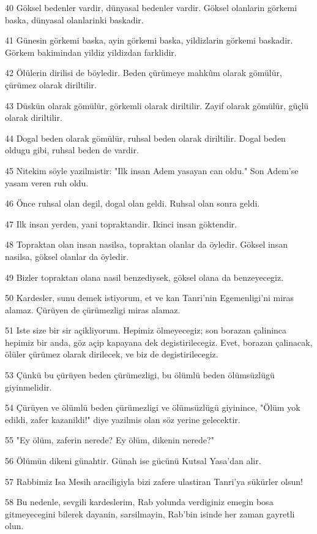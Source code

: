 \par 40 Göksel bedenler vardir, dünyasal bedenler vardir. Göksel olanlarin görkemi baska, dünyasal olanlarinki baskadir.
\par 41 Günesin görkemi baska, ayin görkemi baska, yildizlarin görkemi baskadir. Görkem bakimindan yildiz yildizdan farklidir.
\par 42 Ölülerin dirilisi de böyledir. Beden çürümeye mahkûm olarak gömülür, çürümez olarak diriltilir.
\par 43 Düskün olarak gömülür, görkemli olarak diriltilir. Zayif olarak gömülür, güçlü olarak diriltilir.
\par 44 Dogal beden olarak gömülür, ruhsal beden olarak diriltilir. Dogal beden oldugu gibi, ruhsal beden de vardir.
\par 45 Nitekim söyle yazilmistir: "Ilk insan Adem yasayan can oldu." Son Adem'se yasam veren ruh oldu.
\par 46 Önce ruhsal olan degil, dogal olan geldi. Ruhsal olan sonra geldi.
\par 47 Ilk insan yerden, yani topraktandir. Ikinci insan göktendir.
\par 48 Topraktan olan insan nasilsa, topraktan olanlar da öyledir. Göksel insan nasilsa, göksel olanlar da öyledir.
\par 49 Bizler topraktan olana nasil benzediysek, göksel olana da benzeyecegiz.
\par 50 Kardesler, sunu demek istiyorum, et ve kan Tanri'nin Egemenligi'ni miras alamaz. Çürüyen de çürümezligi miras alamaz.
\par 51 Iste size bir sir açikliyorum. Hepimiz ölmeyecegiz; son borazan çalininca hepimiz bir anda, göz açip kapayana dek degistirilecegiz. Evet, borazan çalinacak, ölüler çürümez olarak dirilecek, ve biz de degistirilecegiz.
\par 53 Çünkü bu çürüyen beden çürümezligi, bu ölümlü beden ölümsüzlügü giyinmelidir.
\par 54 Çürüyen ve ölümlü beden çürümezligi ve ölümsüzlügü giyinince, "Ölüm yok edildi, zafer kazanildi!" diye yazilmis olan söz yerine gelecektir.
\par 55 "Ey ölüm, zaferin nerede? Ey ölüm, dikenin nerede?"
\par 56 Ölümün dikeni günahtir. Günah ise gücünü Kutsal Yasa'dan alir.
\par 57 Rabbimiz Isa Mesih araciligiyla bizi zafere ulastiran Tanri'ya sükürler olsun!
\par 58 Bu nedenle, sevgili kardeslerim, Rab yolunda verdiginiz emegin bosa gitmeyecegini bilerek dayanin, sarsilmayin, Rab'bin isinde her zaman gayretli olun.

